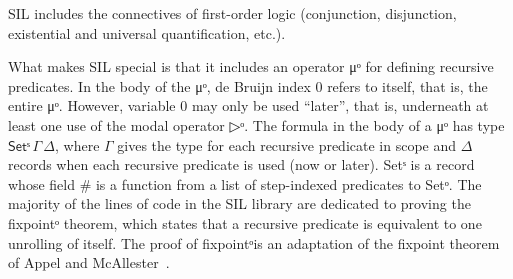 SIL includes the connectives of first-order logic (conjunction,
disjunction, existential and universal quantification, etc.).

What makes SIL special is that it includes an operator μᵒ for defining
recursive predicates. In the body of the μᵒ, de Bruijn index 0 refers
to itself, that is, the entire μᵒ. However, variable 0 may only be
used ``later'', that is, underneath at least one use of the modal
operator ▷ᵒ.  The formula in the body of a μᵒ has type
$\mathsf{Set}ˢ\,Γ\,Δ$, where $Γ$ gives the type for each recursive
predicate in scope and $Δ$ records when each recursive predicate is
used (now or later). \textsf{Setˢ} is a record whose field \textsf{\#}
is a function from a list of step-indexed predicates to \textsf{Setᵒ}.
The majority of the lines of code in the SIL library are dedicated to
proving the \textsf{fixpointᵒ} theorem, which states that a recursive
predicate is equivalent to one unrolling of itself. The proof of
\textsf{fixpointᵒ}is an adaptation of the fixpoint theorem of Appel
and McAllester~\cite{Appel:2001aa}.

\begin{code}%
\>[0]\AgdaFunction{\AgdaUnderscore{}}\AgdaSpace{}%
\AgdaSymbol{:}%
\>[644I]\AgdaSpace{}%
\AgdaSymbol{:}\AgdaSpace{}%
\AgdaSymbol{)}\AgdaSpace{}%
\AgdaSymbol{(}\AgdaSpace{}%
\AgdaSymbol{:}\AgdaSpace{}%
\AgdaSpace{}%
\AgdaSpace{}%
\AgdaSpace{}%
\AgdaSymbol{(}\AgdaSpace{}%
\AgdaSpace{}%
\AgdaInductiveConstructor{[]}\AgdaSymbol{)}\AgdaSpace{}%
\AgdaSymbol{(}\AgdaSpace{}%
\AgdaSpace{}%
\AgdaSymbol{))}\AgdaSpace{}%
\AgdaSymbol{(}\AgdaSpace{}%
\AgdaSymbol{:}\AgdaSpace{}%
\AgdaSymbol{)}\<%
\\
\>[.][@{}l@{}]\<[644I]%
\>[4]\AgdaSpace{}%
\AgdaSpace{}%
\AgdaSpace{}%
\AgdaSpace{}%
\AgdaSpace{}%
\AgdaField{\#}\AgdaSpace{}%
\AgdaSymbol{(}\AgdaSpace{}%
\AgdaSymbol{)}\AgdaSpace{}%
\AgdaSymbol{(}\AgdaSpace{}%
\AgdaSpace{}%
\AgdaOperator{\AgdaInductiveConstructor{,}}\AgdaSpace{}%
\AgdaSymbol{)}\<%
\\
\>[0]\AgdaSymbol{\AgdaUnderscore{}}\AgdaSpace{}%
\AgdaSymbol{=}\AgdaSpace{}%
\AgdaSpace{}%
\AgdaSpace{}%
\AgdaSpace{}%
\AgdaSpace{}%
\AgdaSpace{}%
\AgdaSpace{}%
\AgdaSpace{}%
\<%
\end{code}


